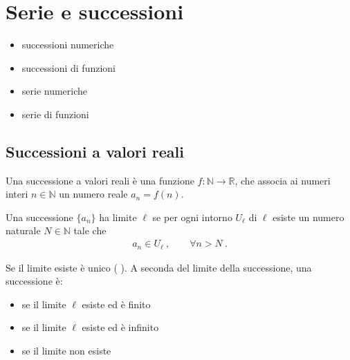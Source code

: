 \documentclass[letterpaper,10pt,english]{jupyterBook}
\begin{document}
\chapter{Serie e successioni}
\label{\detokenize{ch/series:serie-e-successioni}}\label{\detokenize{ch/series:math-hs-series}}\label{\detokenize{ch/series::doc}}\begin{itemize}
\item {} 
\sphinxAtStartPar
successioni numeriche

\item {} 
\sphinxAtStartPar
successioni di funzioni

\item {} 
\sphinxAtStartPar
serie numeriche

\item {} 
\sphinxAtStartPar
serie di funzioni

\end{itemize}


\section{Successioni a valori reali}
\label{\detokenize{ch/series:successioni-a-valori-reali}}
\sphinxAtStartPar
{} Una successione a valori reali è una funzione \(f: \mathbb{N} \rightarrow \mathbb{R}\), che associa ai numeri interi \(n \in \mathbb{N}\) un numero reale \(a_n = f(n)\).

\sphinxAtStartPar
{} Una successione \(\{ a_n \}\) ha limite \(\ell\) se per ogni intorno \(U_{\ell}\) di \(\ell\) esiste un numero naturale \(N \in \mathbb{N}\) tale che
\begin{equation*}
\begin{split}a_n \in U_{\ell} \ , \qquad \forall n > N \ .\end{split}
\end{equation*}
\sphinxAtStartPar
{} 

\sphinxAtStartPar
Se il limite esiste è unico ( ). A seconda del limite della successione, una successione è:
\begin{itemize}
\item {} 
\sphinxAtStartPar
{} se il limite \(\ell\) esiste ed è finito

\item {} 
\sphinxAtStartPar
{} se il limite \(\ell\) esiste ed è infinito

\item {} 
\sphinxAtStartPar
{} se il limite non esiste

\end{itemize}
\end{document}
